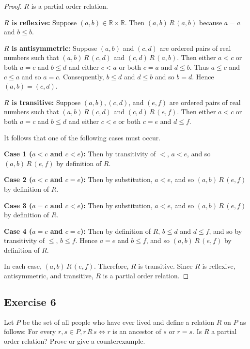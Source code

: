 \documentclass[14pt]{extarticle}
\newcommand{\R}{\mathbb{R}}
\begin{document}
\begin{proof}
        $R$ is a partial order relation.

                {\bf $R$ is reflexive:} Suppose \((a, b) \in \R \times \R\). Then \((a, b) \,R\, (a, b)\) because \(a = a\) and
        \(b \leq b\).

                {\bf $R$ is antisymmetric:} Suppose \((a, b)\) and \((c, d)\) are ordered pairs of real numbers such that \((a, b) \,R
        \, (c, d)\) and \((c, d) \,R\, (a, b)\). Then either \(a < c\) or both \(a = c\) and \(b \leq d\) and either \(c < a\)
        or both \(c = a\) and \(d \leq b\). Thus \(a \leq c\) and \(c \leq a\) and so \(a = c\). Consequently, \(b \leq d\)
        and \(d \leq b\) and so \(b = d\). Hence \((a, b) = (c, d)\).

                {\bf $R$ is transitive:} Suppose \((a, b), (c, d)\), and \((e, f)\) are ordered pairs of real numbers such that
        \((a, b) \,R\, (c, d)\) and \((c, d) \,R\, (e, f)\). Then either \(a < c\) or both \(a = c\) and \(b \leq d\) and
        either \(c < e\) or both \(c = e\) and \(d \leq f\).

        It follows that one of the following cases must occur.

                {\bf Case 1 (\(a < c\) and \(c < e\)):} Then by transitivity of \(<\), \(a < e\), and so \((a, b) \,R\,
        (e, f)\) by definition of \(R\).

                {\bf Case 2 (\(a < c\) and \(c = e\)):} Then by substitution, \(a < e\), and so \((a, b) \,R\, (e, f)\) by
        definition of \(R\).

                {\bf Case 3 (\(a = c\) and \(c < e\)):} Then by substitution, \(a < e\), and so \((a, b) \,R\, (e, f)\) by
        definition of \(R\).

                {\bf Case 4 (\(a = c\) and \(c = e\)):} Then by definition of \(R\), \(b \leq d\) and \(d \leq f\), and so by
        transitivity of \(\leq\), \(b \leq f\). Hence \(a = e\) and \(b \leq f\), and so \((a, b) \,R\, (e, f)\) by definition
        of \(R\).

        In each case, \((a, b) \,R\, (e, f)\). Therefore, \(R\) is transitive. Since \(R\) is reflexive, antisymmetric, and
        transitive, \(R\) is a partial order relation.
\end{proof}

\subsection{Exercise 6}
Let $P$ be the set of all people who have ever lived and define a relation $R$ on $P$ as follows: For every \(r, s
\in P, r \,R\, s \iff r\) is an ancestor of \(s\) or \(r = s\). Is $R$ a partial order relation? Prove or give a
counterexample.
\end{document}
